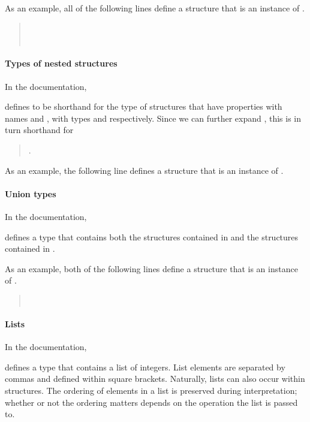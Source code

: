 As an example, all of the following lines define a structure that is an
instance of .
\begin{quote}
  \\
  \\
\end{quote}

\paragraph{Types of nested structures}
In the documentation,
\begin{quote}
\end{quote}
defines  to be shorthand for the type of structures that have properties
with names  and , with types  and 
respectively. Since we can further expand , this is in turn shorthand for
\begin{quote}
  .
\end{quote}

As an example, the following line defines a structure that is an instance of
.
\begin{quote}
\end{quote}

\paragraph{Union types}
In the documentation,
\begin{quote}
\end{quote}
defines a type that contains both the structures contained in  and the
structures contained in .

As an example, both of the following lines define a structure that is an
instance of .
\begin{quote}
  \\
\end{quote}


\paragraph{Lists}
In the documentation,
\begin{quote}
  \tye{ = [Int]}
\end{quote}
defines a type that contains a list of integers. List elements are separated
by commas and defined within square brackets. Naturally, lists can also occur
within structures. The ordering of elements in a list is preserved during
interpretation; whether or not the ordering matters depends on the operation the
list is passed to.

